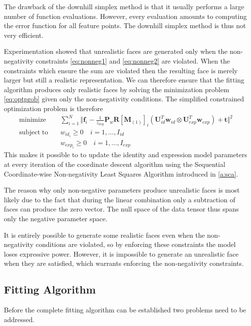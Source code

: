 \documentclass[11pt,a4paper,twoside]{report}
\begin{document}
The drawback of the downhill simplex method is that it usually performs a large
number of function evaluations. However, every evaluation amounts to computing the
error function for all feature points. The downhill simplex method is thus not
very efficient.

Experimentation showed that unrealistic faces are generated only when the
non-negativity constraints \ref{eq:nonneg1} and \ref{eq:nonneg2} are
violated. When the constraints which ensure the sum are violated then the
resulting face is merely larger but still a realistic representation. We can therefore ensure that the fitting algorithm produces only
realistic faces by solving the minimization problem \ref{eq:optprob} given only the non-negativity
conditions. The simplified constrained optimization problem is therefore  
\begin{align}
\mathrm{minimize}\quad &\sum_{i=1}^N \Big\Vert\mathbf{f}_i - \frac{1}{z_{avg}}\mathbf{P}_w\mathbf{R}[\mathbf{M}_{(1)}]_{i}(\mathbf{U}_{id}^T\mathbf{w}_{id} \otimes
\mathbf{U}_{exp}^T\mathbf{w}_{exp}) + \mathbf{t}\Big\Vert^2\\
\mathrm{subject\; to}\quad &w_{id_i} \ge 0 \quad i=1,\ldots ,I_{id}\\\
&w_{exp_i} \ge 0 \quad i=1,\ldots ,I_{exp}
\end{align}
This makes it possible to to update the identity and
expression model parameters at every iteration of the coordinate descent
algorithm using the Sequential Coordinate-wise Non-negativity
Least Squares Algorithm introduced in \ref{a:sca}. 

The reason why only non-negative parameters produce unrealistic faces is most
likely due to the fact that during the linear combination only a subtraction of
faces can produce the zero vector. The null space of the data tensor thus spans only the negative
parameter space. 

It is entirely possible to generate some realistic
faces even when the non-negativity conditions are violated, so by enforcing
these constraints the model loses expressive power. However, it is
impossible to generate an unrealistic face when they are satisfied, which
warrants enforcing the non-negativity constraints.

\subsection{Fitting Algorithm}\label{s:fitalgo}
Before the complete fitting algorithm can be established two problems need to be
addressed. 
\end{document}
